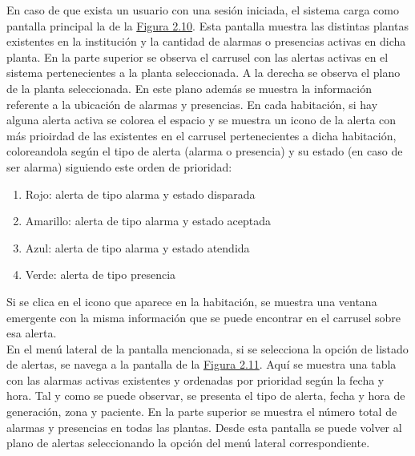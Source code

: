 En caso de que exista un usuario con una sesión iniciada, el sistema carga como pantalla principal la de la \hyperref[fig:map]{Figura 2.10}. Esta pantalla muestra las distintas plantas existentes en la institución y la cantidad de alarmas o presencias activas en dicha planta. En la parte superior se observa el carrusel con las alertas activas en el sistema pertenecientes a la planta seleccionada. A la derecha se observa el plano de la planta seleccionada. En este plano además se muestra la información referente a la ubicación de alarmas y presencias. En cada habitación, si hay alguna alerta activa se colorea el espacio y se muestra un icono de la alerta con más prioirdad de las existentes en el carrusel pertenecientes a dicha habitación, coloreandola según el tipo de alerta (alarma o presencia) y su estado (en caso de ser alarma) siguiendo este orden de prioridad:
\begin{enumerate}
	\item Rojo: alerta de tipo alarma y estado disparada
	\item Amarillo: alerta de tipo alarma y estado aceptada
	\item Azul: alerta de tipo alarma y estado atendida
	\item Verde: alerta de tipo presencia
\end{enumerate}
Si se clica en el icono que aparece en la habitación, se muestra una ventana emergente con la misma información que se puede encontrar en el carrusel sobre esa alerta.\\

En el menú lateral de la pantalla mencionada, si se selecciona la opción de listado de alertas, se navega a la pantalla de la \hyperref[fig:list]{Figura 2.11}. Aquí se muestra una tabla con las alarmas activas existentes y ordenadas por prioridad según la fecha y hora. Tal y como se puede observar, se presenta el tipo de alerta, fecha y hora de generación, zona y paciente. En la parte superior se muestra el número total de alarmas y presencias en todas las plantas. Desde esta pantalla se puede volver al plano de alertas seleccionando la opción del menú lateral correspondiente.


\newpage

